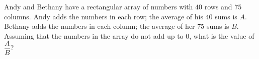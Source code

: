 Andy and Bethany have a rectangular array of numbers with $40$ rows and $75$ columns. Andy adds the numbers in each row; the average of his $40$ sums is $A$. Bethany adds the numbers in each column; the average of her $75$ sums is $B$. Assuming that the numbers in the array do not add up to $0$, what is the value of $\dfrac {A}{B}$?
